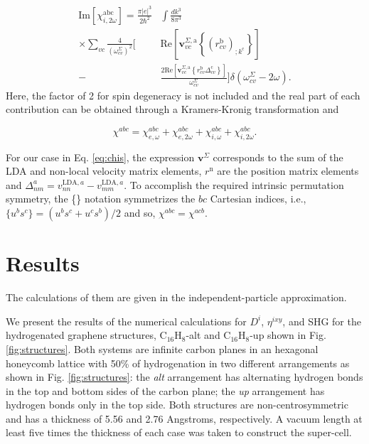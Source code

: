 \documentclass[pss]{wiley2sp} %
\begin{document}
\begin{subequations}
\begin{align}
\mathrm{Im}[\chi^{\mathrm{a}\mathrm{b}\mathrm{c}}_{i,2\omega}]= 
\frac{\pi \vert e\vert^{3}}{2\hbar^2}
&
\int \frac{dk^3}{8\pi^3}
\nonumber \\
\times \sum_{vc}\frac{4}{(\omega^\Sigma_{cv})^{2}}
\Bigg[ 
&
\mathrm{Re}\left[\mathbf{v}^{\Sigma,\mathrm{a}}_{vc}\left\{
\left(r^{\mathrm{b}}_{cv}\right)_{;k^{\mathrm{c}}}\right\}\right] 
\nonumber \\
-
&
\frac{2\mathrm{Re}
\left[\mathbf{v}^{\Sigma,\mathrm{a}}_{vc}\left\{
r^{\mathrm{b}}_{cv}
\Delta^{\mathrm{c}}_{cv}\right\}\right]}{\omega^\Sigma_{cv}}
\Bigg]
\delta(\omega^\Sigma_{cv}-2\omega)
.
\end{align}
\end{subequations}
Here, the factor of 2 for spin degeneracy is not included and the real part of each contribution can be obtained through a Kramers-Kronig transformation \cite{tancogne2014effect} and

\begin{equation}\label{eq:chitotal}
    \chi^{abc} = \chi^{abc}_{e,\omega} + \chi^{abc}_{e,2\omega} +
    \chi^{abc}_{i,\omega} + \chi^{abc}_{i,2\omega}
    .
\end{equation}

For our case in Eq. \ref{eq:chis}, the expression $\mathbf{v}^{\Sigma}$ corresponds to the sum of the LDA and non-local velocity matrix elements, $r^{\mathrm{n}} $ are the position matrix elements and $\Delta^{a}_{nm} = v^{\text{LDA},a}_{nn} - v^{\text{LDA},a}_{mm} $. To accomplish the required intrinsic permutation symmetry, the \{\} notation symmetrizes the $bc$ Cartesian indices, i.e., $\{u^{b}s^{c}\} = (u^{b}s^{c} + u^{c}s^{b})/{2}$ and so, $\chi^{abc} = \chi^{acb}$.


\section{Results}\label{sec:results}

\begin{changed}
The calculations of them are given in the independent-particle approximation.
\end{changed}

We present the results of the numerical calculations for {$D^{i}$}, {$\eta^{ixy}$}, and SHG for
the hydrogenated graphene structures, C$_{16}$H$_{8}$-alt and C$_{16}$H$_{8}$-up shown in Fig.
\ref{fig:structures}. Both systems are infinite carbon planes in an
hexagonal honeycomb lattice with 50\% of hydrogenation in two different
arrangements as shown in Fig. \ref{fig:structures}: the \emph{alt} arrangement has
alternating hydrogen bonds in the top and bottom sides of the carbon plane; the
\emph{up} arrangement has hydrogen bonds only in the top
side. Both structures are non-centrosymmetric and has a thickness of 5.56 and
2.76 Angstroms, respectively. A vacuum length at least  five times the
thickness of each case was taken to construct the super-cell.
\end{document}
